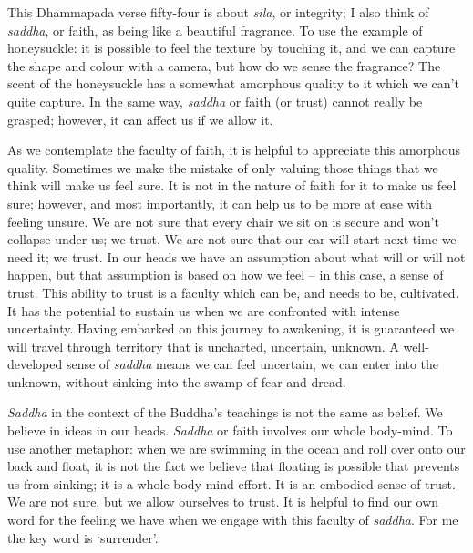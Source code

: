 This Dhammapada verse fifty-four is about \emph{sila}, or integrity; I
also think of \emph{saddha}, or faith, as being like a beautiful
fragrance. To use the example of honeysuckle: it is possible to feel the
texture by touching it, and we can capture the shape and colour with a
camera, but how do we sense the fragrance? The scent of the honeysuckle
has a somewhat amorphous quality to it which we can't quite capture. In
the same way, \emph{saddha} or faith (or trust) cannot really be
grasped; however, it can affect us if we allow it.

As we contemplate the faculty of faith, it is helpful to appreciate this
amorphous quality. Sometimes we make the mistake of only valuing those
things that we think will make us feel sure. It is not in the nature of
faith for it to make us feel sure; however, and most importantly, it can
help us to be more at ease with feeling unsure. We are not sure that
every chair we sit on is secure and won't collapse under us; we trust.
We are not sure that our car will start next time we need it; we trust.
In our heads we have an assumption about what will or will not happen,
but that assumption is based on how we feel -- in this case, a sense of
trust. This ability to trust is a faculty which can be, and needs to be,
cultivated. It has the potential to sustain us when we are confronted
with intense uncertainty. Having embarked on this journey to awakening,
it is guaranteed we will travel through territory that is uncharted,
uncertain, unknown. A well-developed sense of \emph{saddha} means we can
feel uncertain, we can enter into the unknown, without sinking into the
swamp of fear and dread.

\emph{Saddha} in the context of the Buddha's teachings is not the same
as belief. We believe in ideas in our heads. \emph{Saddha} or faith
involves our whole body-mind. To use another metaphor: when we are
swimming in the ocean and roll over onto our back and float, it is not
the fact we believe that floating is possible that prevents us from
sinking; it is a whole body-mind effort. It is an embodied sense of
trust. We are not sure, but we allow ourselves to trust. It is helpful
to find our own word for the feeling we have when we engage with this
faculty of \emph{saddha}. For me the key word is `surrender'.


